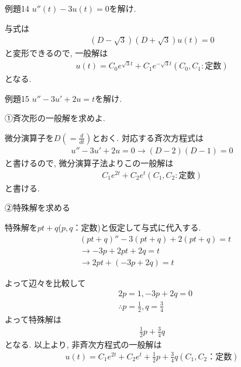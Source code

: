 \documentclass[a4paper,12pt]{jlreq}
\begin{document}
\begin{itembox}[l]{例題14}
$u''(t) - 3u(t) = 0$を解け.
\end{itembox}


\par
与式は
\begin{align*}
    (D - \sqrt{3})(D + \sqrt{3})u(t) = 0
\end{align*}
と変形できるので, 一般解は
\begin{align*}
    u(t) = C_0 e^{\sqrt{3}t} + C_1 e^{-\sqrt{3}t}　(C_0,C_1:\text{定数})
\end{align*}
となる.




\begin{itembox}[l]{例題15}
$u'' - 3u' + 2u = t$を解け.
\end{itembox}

\par
①斉次形の一般解を求めよ.\par

微分演算子を$D(=\frac{d}{dt})$とおく.
対応する斉次方程式は
\begin{align*}
    u'' -3u' + 2u = 0 \rightarrow (D-2)(D-1)=0
\end{align*}
と書けるので, 微分演算子法よりこの一般解は
\begin{align*}
    C_1 e^{2t} + C_2 e^{t} 　(C_1,C_2:\text{定数})
\end{align*}
と書ける.

②特殊解を求める\par
特殊解を$pt + q$($p,q$：定数)と仮定して与式に代入する. 
\begin{align*}
    &(pt+q)'' -3(pt+q) + 2(pt+q) = t\\
    &\rightarrow -3p + 2pt + 2q = t\\
    &\rightarrow 2pt + (-3p + 2q) = t
\end{align*}

よって辺々を比較して
\begin{align*}
    &2p=1,　-3p+2q = 0\\
    &\therefore p = \frac{1}{2}, q = \frac{3}{4}
\end{align*}
よって特殊解は
\begin{align*}
    \frac{1}{2} p + \frac{3}{4} q
\end{align*}
となる. 以上より, 非斉次方程式の一般解は
\begin{align*}
    u(t) = C_1 e^{2t} + C_2 e^{t} + \frac{1}{2} p + \frac{3}{4} q 　(C_1,C_2：\text{定数})
\end{align*}
\end{document}
